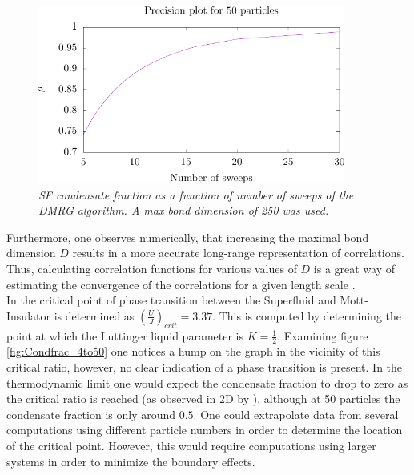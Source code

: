 \begin{figure}[h!]
    \centering
    \includegraphics[width=0.9\textwidth]{Figures/condFracSweeps.pdf}
    \caption{\textit{SF condensate fraction as a function of number of sweeps of the DMRG algorithm. A max bond dimension of 250 was used.}}
    \label{fig:sweepdependence}
\end{figure}
Furthermore, one observes numerically, that increasing the maximal bond dimension $D$ results in a more accurate long-range representation of correlations. Thus, calculating correlation functions for various values of $D$ is a great way of estimating the convergence of the correlations for a given length scale \cite{schollwock}.\\

In \cite{Kuhner2000} the critical point of phase transition between the Superfluid and Mott-Insulator is determined as $\left( \frac{U}{J} \right)_{crit} = 3.37$. This is computed by determining the point at which the Luttinger liquid parameter is $K =  \frac{1}{2}$. Examining figure \ref{fig:Condfrac_4to50} one notices a hump on the graph in the vicinity of this critical ratio, however, no clear indication of a phase transition is present. In the thermodynamic limit one would expect the condensate fraction to drop to zero as the critical ratio is reached (as observed in 2D by \cite{Spielman2008}), although at 50 particles the condensate fraction is only around $0.5$. One could extrapolate data from several computations using different particle numbers in order to determine the location of the critical point. However, this would require computations using larger systems in order to minimize the boundary effects.\\  



